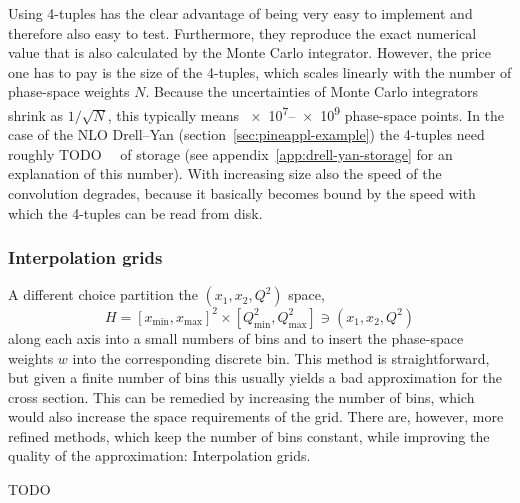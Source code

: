 Using 4-tuples has the clear advantage of being very easy to implement and therefore also easy to test.
Furthermore, they reproduce the exact numerical value that is also calculated by the Monte Carlo integrator.
However, the price one has to pay is the size of the 4-tuples, which scales linearly with the number of phase-space weights $N$.
Because the uncertainties of Monte Carlo integrators shrink as $1/\sqrt{N}$, this typically means \numrange{e7}{e9} phase-space points.
In the case of the NLO Drell--Yan (section~\ref{sec:pineappl-example}) the 4-tuples need roughly TODO~\si{\giga\byte} of storage (see appendix~\ref{app:drell-yan-storage} for an explanation of this number).
With increasing size also the speed of the convolution degrades, because it basically becomes bound by the speed with which the 4-tuples can be read from disk.

\subsubsection{Interpolation grids}

A different choice partition the $(x_1, x_2, Q^2)$ space,
\begin{equation}
H = [x_\mathrm{min},x_\mathrm{max}]^2 \times [Q^2_\mathrm{min}, Q^2_\mathrm{max}] \ni (x_1, x_2, Q^2)
\end{equation}
along each axis into a small numbers of bins and to insert the phase-space weights $w$ into the corresponding discrete bin.
This method is straightforward, but given a finite number of bins this usually yields a bad approximation for the cross section.
This can be remedied by increasing the number of bins, which would also increase the space requirements of the grid.
There are, however, more refined methods, which keep the number of bins constant, while improving the quality of the approximation: Interpolation grids.

TODO
